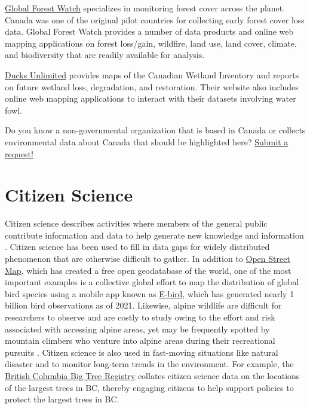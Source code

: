 \documentclass[
]{book}
\begin{document}
\href{https://www.globalforestwatch.org/}{Global Forest Watch} specializes in monitoring forest cover across the planet. Canada was one of the original pilot countries for collecting early forest cover loss data. Global Forest Watch provides a number of data products and online web mapping applications on forest loss/gain, wildfire, land use, land cover, climate, and biodiversity that are readily available for analysis.

\href{https://www.ducks.ca}{Ducks Unlimited} provides maps of the Canadian Wetland Inventory and reports on future wetland loss, degradation, and restoration. Their website also includes online web mapping applications to interact with their datasets involving water fowl.

Do you know a non-governmental organization that is based in Canada or collects environmental data about Canada that should be highlighted here? \href{https://github.com/ubc-geomatics-textbook/geomatics-textbook/issues/new/choose}{Submit a request!}

\section{Citizen Science}\label{citizen-science}

Citizen science describes activities where members of the general public contribute information and data to help generate new knowledge and information \citep{lee_review_2020}. Citizen science has been used to fill in data gaps for widely distributed phenomenon that are otherwise difficult to gather. In addition to \href{https://www.openstreetmap.org/}{Open Street Map}, which has created a free open geodatabase of the world, one of the most important examples is a collective global effort to map the distribution of global bird species using a mobile app known as \href{https://ebird.org/home}{E-bird}, which has generated nearly 1 billion bird observations as of 2021. Likewise, alpine wildlife are difficult for researchers to observe and are costly to study owing to the effort and risk associated with accessing alpine areas, yet may be frequently spotted by mountain climbers who venture into alpine areas during their recreational pursuits \citep{jackson_citizen_2015}. Citizen science is also used in fast-moving situations like natural disaster and to monitor long-term trends in the environment. For example, the \href{https://bigtrees.forestry.ubc.ca/bc-bigtree-registry/}{British Columbia Big Tree Registry} collates citizen science data on the locations of the largest trees in BC, thereby engaging citizens to help support policies to protect the largest trees in BC.
\end{document}

